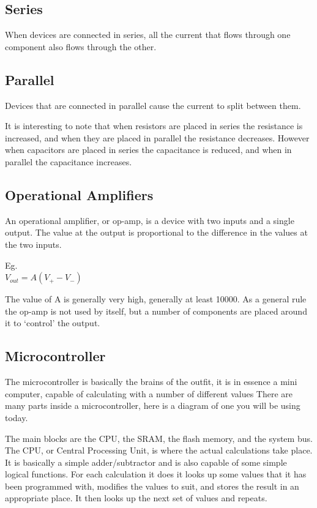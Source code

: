 \subsection{Series}
When devices are connected in series, all the current that flows through one component also flows through the other.

\subsection{Parallel}
Devices that are connected in parallel cause the current to split between them.

It is interesting to note that when resistors are placed in series the resistance is increased, and when they are placed in parallel the resistance decreases.
However when capacitors are placed in series the capacitance is reduced, and when in parallel the capacitance increases.

\subsection{Operational Amplifiers}
An operational amplifier, or op-amp, is a device with two inputs and a single output.
The value at the output is proportional to the difference in the values at the two inputs.

Eg.\\
$V_{out} = A(V_{+} - V_{-})$

The value of A is generally very high, generally at least 10000.
As a general rule the op-amp is not used by itself, but a number of components are placed around it to `control' the output.

\subsection{Microcontroller}

The microcontroller is basically the brains of the outfit, it is in essence a mini computer, capable of calculating with a number of different values
There are many parts inside a microcontroller, here is a diagram of one you will be using today.

The main blocks are the CPU, the SRAM, the flash memory, and the system bus.
The CPU, or Central Processing Unit, is where the actual calculations take place.
It is basically a simple adder/subtractor and is also capable of some simple logical functions.
For each calculation it does it looks up some values that it has been programmed with, modifies the values to suit, and stores the result in an appropriate place.
It then looks up the next set of values and repeats.

